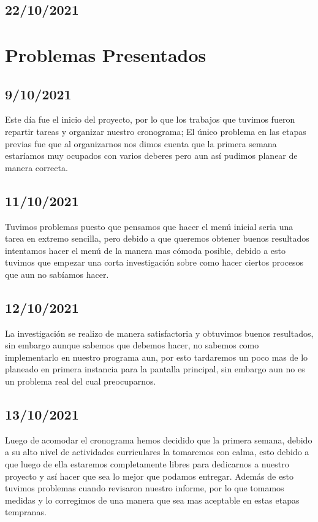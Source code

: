 \documentclass{article}
\begin{document}
    \subsection{22/10/2021}
    
\section{Problemas Presentados}
    \subsection{9/10/2021}
    Este día fue el inicio del proyecto, por lo que los trabajos que tuvimos fueron repartir tareas y organizar nuestro cronograma; El único problema en las etapas previas fue que al organizarnos nos dimos cuenta que la primera semana estaríamos muy ocupados con varios deberes pero aun así pudimos planear de manera correcta.

    \subsection{11/10/2021}
    Tuvimos problemas puesto que pensamos que hacer el menú inicial seria una tarea en extremo sencilla, pero debido a que queremos obtener buenos resultados intentamos hacer el menú de la manera mas cómoda posible, debido a esto tuvimos que empezar una corta investigación sobre como hacer ciertos procesos que aun no sabíamos hacer.
    
    \subsection{12/10/2021}
    La investigación se realizo de manera satisfactoria y obtuvimos buenos resultados, sin embargo aunque sabemos que debemos hacer, no sabemos como implementarlo en nuestro programa aun, por esto tardaremos un poco mas de lo planeado en primera instancia para la pantalla principal, sin embargo aun no es un problema real del cual preocuparnos.
    
    \subsection{13/10/2021}
    Luego de acomodar el cronograma hemos decidido que la primera semana, debido a su alto nivel de actividades curriculares la tomaremos con calma, esto debido a que luego de ella estaremos completamente libres para dedicarnos a nuestro proyecto y así hacer que sea lo mejor que podamos entregar. Además de esto tuvimos problemas cuando revisaron nuestro informe, por lo que tomamos medidas y lo corregimos de una manera que sea mas aceptable en estas etapas tempranas.
    
\end{document}
